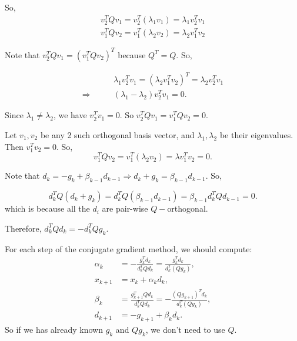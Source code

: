 \documentclass[
  course = {{16-811 Math Fundamentals for Robotics}},
  quartile = {{1}},
  assignment = 4,
  name = {{Kangle Deng}},
  email = {{kangled@andrew.cmu.edu}},
  firstexercise = 1
]{aga-homework}
\begin{document}
So,
\begin{equation*}
    \begin{aligned}
    v_2^TQv_1 = v_2^T(\lambda_1 v_1) = \lambda_1 v_2^T v_1 \\ 
    v_1^TQv_2 = v_1^T(\lambda_2 v_2) = \lambda_2 v_1^T v_2
    \end{aligned}
\end{equation*}

Note that $v_2^TQv_1 = (v_1^TQv_2)^T$ because $Q^T = Q$. So,

\begin{equation*}
\begin{aligned}
   & \lambda_1 v_2^T v_1 = (\lambda_2 v_1^T v_2)^T = \lambda_2 v_2^T v_1 \\
   \Rightarrow \qquad & (\lambda_1 - \lambda_2)  v_2^T v_1 = 0.
\end{aligned}

\end{equation*}

Since $\lambda_1 \ne \lambda_2$, we have $v_2^T v_1 = 0$. So $v_2^TQv_1 = v_1^TQv_2 = 0$.

\subexercise
Let $v_1, v_2$ be any 2 such orthogonal basis vector, and $\lambda_1, \lambda_2$ be their eigenvalues. Then $v_1^Tv_2 = 0$. So, 
\begin{equation*}
    v_1^TQv_2 = v_1^T(\lambda_2v_2) = \lambda v_1^Tv_2 = 0.
\end{equation*}

\exercise
\subexercise
Note that $d_{k} = -g_k + \beta_{k-1}d_{k-1} \Rightarrow d_k + g_k = \beta_{k-1}d_{k-1}$. So,

\begin{equation*}
    d_k^TQ(d_k + g_k) = d_k^TQ(\beta_{k-1}d_{k-1}) = \beta_{k-1} d_k^TQd_{k-1} = 0.
\end{equation*}
which is because all the $d_i$ are pair-wise $Q-$orthogonal.

Therefore, $d_k^TQd_k = -d_k^TQg_k$.

For each step of the conjugate gradient method, we should compute:
\begin{equation*}
    \begin{aligned}
       \alpha_k & = -\frac{g_k^Td_k}{d_k^TQd_k} = \frac{g_k^Td_k}{d_k^T(Qg_k)}, \\
       x_{k+1} & = x_k + \alpha_k d_k, \\
       \beta_k & = \frac{g_{k+1}^TQd_k}{d_k^TQd_k} = -\frac{(Qg_{k+1})^Td_k}{d_k^T(Qg_k)}, \\
       d_{k+1} & = -g_{k+1} + \beta_k d_k.
    \end{aligned}
\end{equation*}
So if we has already known $g_k$ and $Qg_k$, we don't need to use $Q$.
\end{document}

